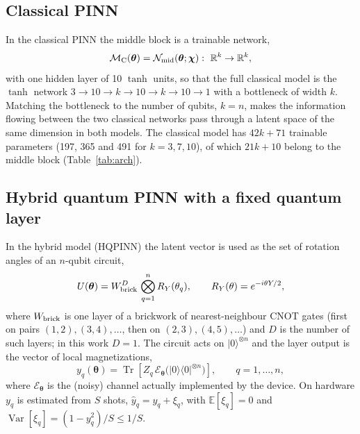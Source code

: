\documentclass[floatfix,aps,pra,twocolumn,showpacs,superscriptaddress,10pt,nofootinbib]{revtex4-2}
\begin{document}
\subsection{Classical PINN}\label{sec:classical}

In the classical PINN the middle block is a trainable network,
\begin{equation}
  \mathcal M_{\rm C}(\bm\theta)=\mathcal N_{\rm mid}(\bm\theta;\bm\chi):\ \mathbb R^k\to\mathbb R^k,
  \label{eq:bottleneck}
\end{equation}
with one hidden layer of 10 $\tanh$ units, so that the full classical model is the $\tanh$ network $3\to10\to k\to10\to k\to10\to1$ with a bottleneck of width $k$. Matching the bottleneck to the number of qubits, $k=n$, makes the information flowing between the two classical networks pass through a latent space of the same dimension in both models. The classical model has $42k+71$ trainable parameters (197, 365 and 491 for $k=3,7,10$), of which $21k+10$ belong to the middle block (Table~\ref{tab:arch}).

\subsection{Hybrid quantum PINN with a fixed quantum layer}\label{sec:hqpinn}

In the hybrid model (HQPINN) the latent vector is used as the set of rotation angles of an $n$-qubit circuit,
\begin{equation}
  U(\bm\theta)=W_{\rm brick}^{D}\,\bigotimes_{q=1}^{n}R_Y(\theta_q),\qquad R_Y(\theta)=e^{-i\theta Y/2},
  \label{eq:circuit}
\end{equation}
where $W_{\rm brick}$ is one layer of a brickwork of nearest-neighbour CNOT gates (first on pairs $(1,2),(3,4),\dots$, then on $(2,3),(4,5),\dots$) and $D$ is the number of such layers; in this work $D=1$. The circuit acts on $|0\rangle^{\otimes n}$ and the layer output is the vector of local magnetizations,
\begin{equation}
  y_q(\bm\theta)=\operatorname{Tr}\!\left[Z_q\,\mathcal E_{\bm\theta}\big(|0\rangle\langle0|^{\otimes n}\big)\right],\qquad q=1,\dots,n,
  \label{eq:expval}
\end{equation}
where $\mathcal E_{\bm\theta}$ is the (noisy) channel actually implemented by the device. On hardware $y_q$ is estimated from $S$ shots, $\hat y_q=y_q+\xi_q$, with $\mathbb E[\xi_q]=0$ and $\operatorname{Var}[\xi_q]=(1-y_q^2)/S\le 1/S$.
\end{document}
